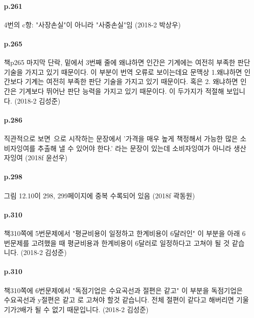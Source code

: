 \documentclass[a4paper]{article}
\begin{document}
\paragraph{p.261} %
\label{par:p_261}
4번의 c항: "사장손실"이 아니라 "사중손실"임 (2018-2 박상우)
\paragraph{p.265} %
\label{par:p_265}
책p265 마지막 단락, 밑에서 3번째 줄에 왜냐하면 인간은 기계에는 여전히 부족한 판단 기술을 가지고 있기 때문이다. 
이 부분이 번역 오류로 보이는데요
 문맥상 
1.왜냐하면 인간보다 기계는 여전히 부족한 판단 기술을 가지고 있기 때문이다.  
혹은 
2. 왜냐하면 인간은 기계보다 뛰어난 판단 능력을 가지고 있기 때문이다.
이 두가지가 적절해 보입니다.  (2018-2 김성준)

\paragraph{p.286} %
\label{par:p_286}
직관적으로 보면~으로 시작하는 문장에서 '가격을 매우 높게 책정해서 가능한 많은 소비자잉여를 추출해 낼 수 있어야 한다.' 라는 문장이 있는데 소비자잉여가 아니라 생산자잉여 (2018f 윤선우)

\paragraph{p.298} %
\label{par:p_298}
그림 12.10이 298, 299페이지에 중복 수록되어 있음 (2018f 곽동원)


\paragraph{p.310} %
\label{par:p_310}
책310쪽에 5번문제에서 "평균비용이 일정하고 한계비용이 6달러인" 이 부분을 아래 6번문제를 고려했을 때 평균비용과 한계비용이 6달러로 일정하다고 고쳐야 될 것 같습니다. (2018-2 김성준)

\paragraph{p.310} %
\label{par:p_310a}
책310쪽에 6번문제에서 "독점기업은 수요곡선과 절편은 같고" 이 부분을 독점기업은 수요곡선과 y절편은 같고 로 고쳐야 할것 같습니다.
전체 절편이 같다고 해버리면 기울기가2배가 될 수 없기 때문입니다. (2018-2 김성준)
\end{document}

